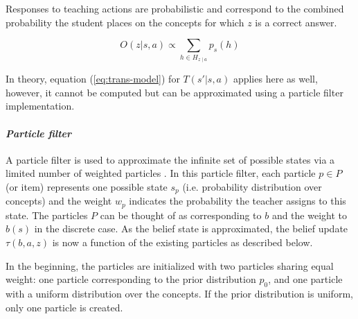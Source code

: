 Responses to teaching actions are probabilistic and correspond to the combined probability the student places on the concepts for which $z$ is a correct answer.

\begin{equation}
    O(z|s,a) \propto \sum_{h \in H_{z \mid a}} p_s(h)
\end{equation}

In theory, equation (\ref{eq:trans-model}) for $T(s'|s,a)$ applies here as well, however, it cannot be computed but can be approximated using a particle filter implementation.





\paragraph{\textit{Particle filter}}
A particle filter is used to approximate the infinite set of possible states via a limited number of weighted particles \cite{DoucetSeqMCM2001}.
In this particle filter, each particle $p \in P$ (or item) represents one possible state $s_p$ (i.e. probability distribution over concepts) and the weight $w_p$ indicates the probability the teacher assigns to this state.
The particles $P$ can be thought of as corresponding to $b$ and the weight to $b(s)$ in the discrete case.
As the belief state is approximated, the belief update $\tau(b,a,z)$ is now a function of the existing particles as described below.

In the beginning, the particles are initialized with two particles sharing equal weight: one particle corresponding to the prior distribution $p_0$, and one particle with a uniform distribution over the concepts. 
If the prior distribution is uniform, only one particle is created.

